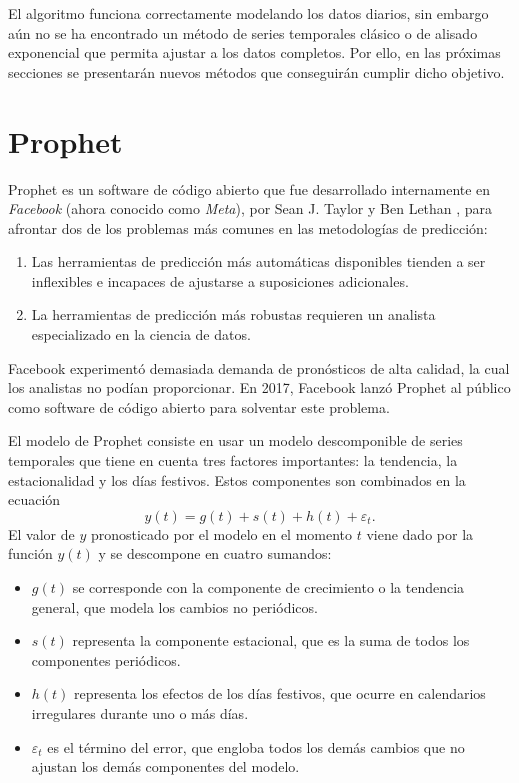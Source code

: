 \documentclass[12pt,twoside]{article}
\begin{document}
El algoritmo funciona correctamente modelando los datos diarios, sin embargo aún no se ha encontrado un método de series temporales clásico o de alisado exponencial que permita ajustar a los datos completos. Por ello, en las próximas secciones se presentarán nuevos métodos que conseguirán cumplir dicho objetivo.









\newpage
\section{Prophet}
Prophet es un software de código abierto que fue desarrollado internamente en \emph{Facebook} (ahora conocido como \emph{Meta}), por Sean J. Taylor y Ben Lethan \cite{Prophet1}, para afrontar dos de los problemas más comunes en las metodologías de predicción:
\begin{enumerate}
    \item Las herramientas de predicción más automáticas disponibles tienden a ser inflexibles e incapaces de ajustarse a suposiciones adicionales.
    \item La herramientas de predicción más robustas requieren un analista especializado en la ciencia de datos.
\end{enumerate}

Facebook experimentó demasiada demanda de pronósticos de alta calidad, la cual los analistas no podían proporcionar. En 2017, Facebook lanzó Prophet al público como software de código abierto para solventar este problema.

El modelo de Prophet consiste en usar un modelo descomponible de series temporales que tiene en cuenta tres factores importantes: la tendencia, la estacionalidad y los días festivos. Estos componentes son combinados en la ecuación
\begin{equation}\label{eq:prophet:descom}
    y(t) = g(t) + s(t) + h(t) + \varepsilon_t .
\end{equation}
El valor de $y$ pronosticado por el modelo en el momento $t$ viene dado por la función $y(t)$ y se descompone en cuatro sumandos:
\begin{itemize}
    \item $g(t)$ se corresponde con la componente de crecimiento o la tendencia general, que modela los cambios no periódicos.
    \item $s(t)$ representa la componente estacional, que es la suma de todos los componentes periódicos.
    \item $h(t)$ representa los efectos de los días festivos, que ocurre en calendarios irregulares durante uno o más días.
    \item $\varepsilon_t$ es el término del error, que engloba todos los demás cambios que no ajustan los demás componentes del modelo.
\end{itemize}
\end{document}
